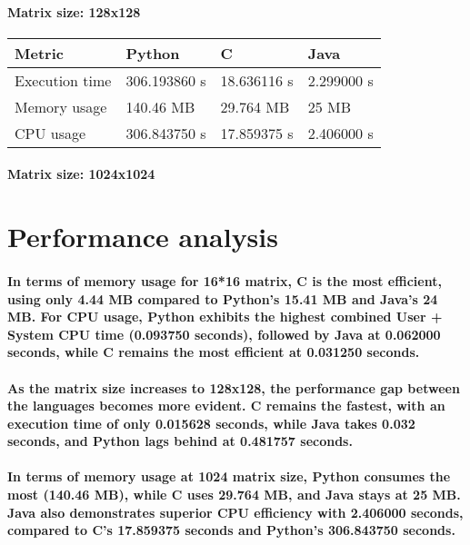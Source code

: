 \documentclass{article}
\begin{document}
\paragraph{Matrix size: 128x128}

\hfill 
\newline

\begin{tabular}{| l | l | l | l |}
\hline
Metric & Python & C & Java \\ \hline
Execution time & 306.193860 s & 18.636116 s & 2.299000 s \\ \hline
Memory usage & 140.46 MB & 29.764 MB & 25 MB \\ \hline
CPU usage & 306.843750 s & 17.859375 s & 2.406000 s \\
\hline
\end{tabular}
\paragraph{Matrix size: 1024x1024}

\hfill 
\newline

\section{Performance analysis}

\paragraph{In terms of memory usage for 16*16 matrix, C is the most efficient, using only 4.44 MB compared to Python's 15.41 MB and Java's 24 MB. For CPU usage, Python exhibits the highest combined User + System CPU time (0.093750 seconds), followed by Java at 0.062000 seconds, while C remains the most efficient at 0.031250 seconds.}

\paragraph{As the matrix size increases to 128x128, the performance gap between the languages becomes more evident. C remains the fastest, with an execution time of only 0.015628 seconds, while Java takes 0.032 seconds, and Python lags behind at 0.481757 seconds.}

\paragraph{In terms of memory usage at 1024 matrix size, Python consumes the most (140.46 MB), while C uses 29.764 MB, and Java stays at 25 MB. Java also demonstrates superior CPU efficiency with 2.406000 seconds, compared to C’s 17.859375 seconds and Python’s 306.843750 seconds.}
\end{document}

